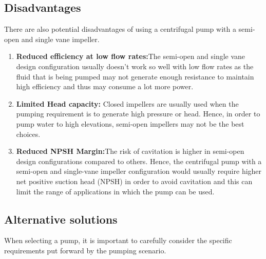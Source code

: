 \documentclass[11pt,a4paper]{scrartcl}
\begin{document}
\subsection{Disadvantages}
There are also potential disadvantages of using a centrifugal pump with a semi-open and single vane impeller.
\begin{enumerate}
    
        \item \textbf{Reduced efficiency at low flow rates:}The semi-open and single vane design configuration usually doesn’t work so well with low flow rates as the fluid that is being pumped may not generate enough resistance to maintain high efficiency and thus may consume a lot more power. 
        \item \textbf{Limited Head capacity:} Closed impellers are usually used when the pumping requirement is to generate high pressure or head. Hence, in order to pump water to high elevations, semi-open impellers may not be the best choices.

        \item \textbf{ Reduced NPSH Margin:}The risk of cavitation is higher in semi-open design configurations compared to others. Hence, the centrifugal pump with a semi-open and single-vane impeller configuration would usually require higher net positive suction head (NPSH) in order to avoid cavitation and this can limit the range of applications in which the pump can be used.
 
\end{enumerate}
\subsection{ Alternative solutions}
When selecting a pump, it is important to carefully consider the specific requirements put forward by the pumping scenario. 
\end{document}
